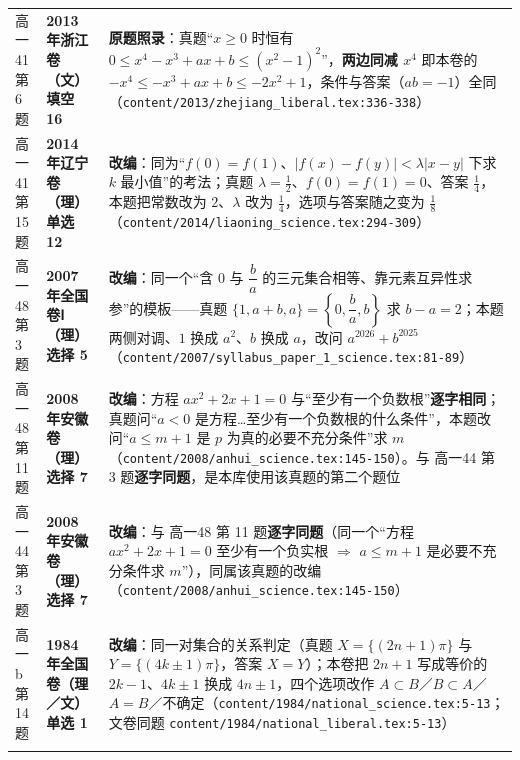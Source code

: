 \documentclass[a4paper,11pt]{article}
\begin{document}
\begin{xltabular}{\textwidth}{@{}>{\raggedright\arraybackslash}p{2.85cm}>{\raggedright\arraybackslash}p{3.99cm}>{\raggedright\arraybackslash}p{7.89cm}@{}}
高一41 第 6 题 & \textbf{2013 年浙江卷（文）填空 16} & \textbf{原题照录}：真题``\(x\geqslant\allowbreak 0\) 时恒有 \(0\leqslant\allowbreak  x^4-x^3+ax+b\leqslant\allowbreak (x^2-1)^2\)''，\textbf{两边同减 \(x^4\)} 即本卷的 \(-x^4\leqslant\allowbreak -x^3+ax+b\leqslant\allowbreak -2x^2+\allowbreak 1\)，条件与答案（\(ab=\allowbreak -1\)）全同（\texttt{content/\allowbreak{}2013/\allowbreak{}zhejiang\_liberal.tex:336-\allowbreak{}338}） \\ \addlinespace[1pt]
高一41 第 15 题 & \textbf{2014 年辽宁卷（理）单选 12} & \textbf{改编}：同为``\(f(0)=f(1)\)、\(\lvert f(x)-f(y)\rvert<\lambda\lvert x-y\rvert\) 下求 \(k\) 最小值''的考法；真题 \(\lambda=\allowbreak \frac12\)、\(f(0)=f(1)=\allowbreak 0\)、答案 \(\frac14\)，本题把常数改为 \(2\)、\(\lambda\) 改为 \(\frac14\)，选项与答案随之变为 \(\frac18\)（\texttt{content/\allowbreak{}2014/\allowbreak{}liaoning\_science.tex:294-\allowbreak{}309}） \\ \addlinespace[1pt]
高一48 第 3 题 & \textbf{2007 年全国卷Ⅰ（理）选择 5} & \textbf{改编}：同一个``含 \(0\) 与 \(\dfrac ba\) 的三元集合相等、靠元素互异性求参''的模板------真题 \(\{1,a+b,a\}=\allowbreak \left\{0,\allowbreak \dfrac ba,b\right\}\) 求 \(b-a=\allowbreak 2\)；本题两侧对调、\(1\) 换成 \(a^2\)、\(b\) 换成 \(a\)，改问 \(a^{2026}+b^{2025}\)（\texttt{content/\allowbreak{}2007/\allowbreak{}syllabus\_paper\_1\_science.tex:81-\allowbreak{}89}） \\ \addlinespace[1pt]
高一48 第 11 题 & \textbf{2008 年安徽卷（理）选择 7} & \textbf{改编}：方程 \(ax^2+\allowbreak 2x+\allowbreak 1=\allowbreak 0\) 与``至少有一个负数根''\textbf{逐字相同}；真题问``\(a<0\) 是方程\ldots 至少有一个负数根的什么条件''，本题改问``\(a\leqslant\allowbreak  m+\allowbreak 1\) 是 \(p\) 为真的必要不充分条件''求 \(m\)（\texttt{content/\allowbreak{}2008/\allowbreak{}anhui\_science.tex:145-\allowbreak{}150}）。与 高一44 第 3 题\textbf{逐字同题}，是本库使用该真题的第二个题位 \\ \addlinespace[1pt]
高一44 第 3 题 & \textbf{2008 年安徽卷（理）选择 7} & \textbf{改编}：与 高一48 第 11 题\textbf{逐字同题}（同一个``方程 \(ax^2+\allowbreak 2x+\allowbreak 1=\allowbreak 0\) 至少有一个负实根 $\Rightarrow$ \(a\leqslant\allowbreak  m+\allowbreak 1\) 是必要不充分条件求 \(m\)''），同属该真题的改编（\texttt{content/\allowbreak{}2008/\allowbreak{}anhui\_science.tex:145-\allowbreak{}150}） \\ \addlinespace[1pt]
高一b 第 14 题 & \textbf{1984 年全国卷（理／文）单选 1} & \textbf{改编}：同一对集合的关系判定（真题 \(X=\allowbreak \{(2n+\allowbreak 1)\pi\}\) 与 \(Y=\allowbreak \{(4k\pm1)\pi\}\)，答案 \(X=Y\)）；本卷把 \(2n+\allowbreak 1\) 写成等价的 \(2k-1\)、\(4k\pm1\) 换成 \(4n\pm1\)，四个选项改作 \(A\subset\allowbreak  B\)／\(B\subset\allowbreak  A\)／\(A=B\)／不确定（\texttt{content/\allowbreak{}1984/\allowbreak{}national\_science.tex:5-\allowbreak{}13}；文卷同题 \texttt{content/\allowbreak{}1984/\allowbreak{}national\_liberal.tex:5-\allowbreak{}13}） \\ \addlinespace[1pt]

\end{xltabular}
\end{document}
